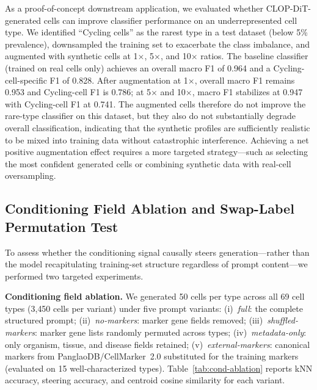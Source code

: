 \documentclass[biology,article,submit,pdftex,moreauthors]{Definitions/mdpi}
\begin{document}
As a proof-of-concept downstream application, we evaluated whether CLOP-DiT-generated cells can improve classifier performance on an underrepresented cell type. We identified ``Cycling cells'' as the rarest type in a test dataset (below 5\% prevalence), downsampled the training set to exacerbate the class imbalance, and augmented with synthetic cells at 1$\times$, 5$\times$, and 10$\times$ ratios. The baseline classifier (trained on real cells only) achieves an overall macro F1 of 0.964 and a Cycling-cell-specific F1 of 0.828. After augmentation at 1$\times$, overall macro F1 remains 0.953 and Cycling-cell F1 is 0.786; at 5$\times$ and 10$\times$, macro F1 stabilizes at 0.947 with Cycling-cell F1 at 0.741. The augmented cells therefore do not improve the rare-type classifier on this dataset, but they also do not substantially degrade overall classification, indicating that the synthetic profiles are sufficiently realistic to be mixed into training data without catastrophic interference. Achieving a net positive augmentation effect requires a more targeted strategy---such as selecting the most confident generated cells or combining synthetic data with real-cell oversampling.

\subsection{Conditioning Field Ablation and Swap-Label Permutation Test}\label{sec:cond-ablation}

To assess whether the conditioning signal causally steers generation---rather than the model recapitulating training-set structure regardless of prompt content---we performed two targeted experiments.

\textbf{Conditioning field ablation.} We generated 50 cells per type across all 69 cell types (3{,}450 cells per variant) under five prompt variants: (i)~\emph{full}: the complete structured prompt; (ii)~\emph{no-markers}: marker gene fields removed; (iii)~\emph{shuffled-markers}: marker gene lists randomly permuted across types; (iv)~\emph{metadata-only}: only organism, tissue, and disease fields retained; (v)~\emph{external-markers}: canonical markers from PanglaoDB/CellMarker~2.0 substituted for the training markers (evaluated on 15 well-characterized types). Table~\ref{tab:cond-ablation} reports kNN accuracy, steering accuracy, and centroid cosine similarity for each variant.
\end{document}
